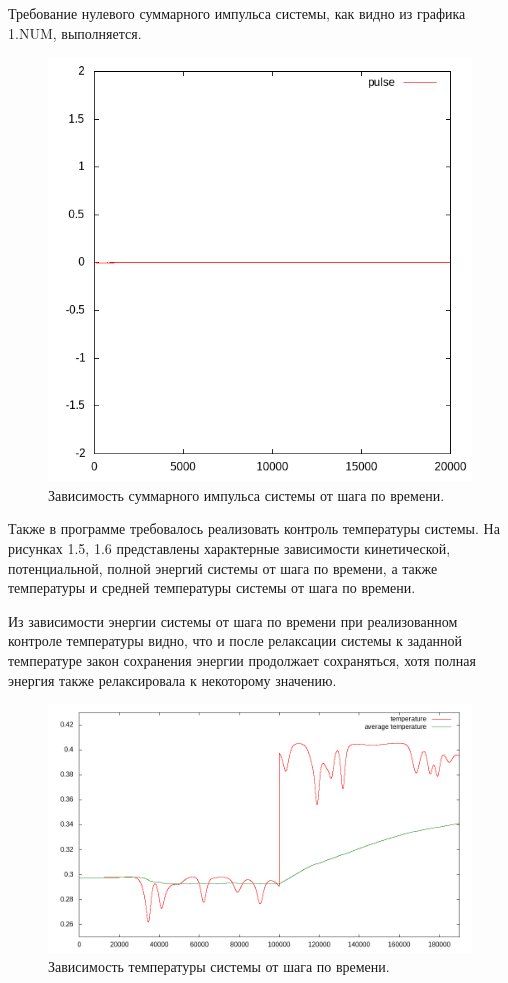 \documentclass[14pt,a4paper,report]{ncc}
\begin{document}
Требование нулевого суммарного импульса системы, как видно из графика 1.NUM, выполняется. 

\begin{figure}[!h]
\includegraphics[scale=0.8]{pulse}
\caption{Зависимость суммарного импульса системы от шага по времени.}
\end{figure}
Также в программе требовалось реализовать контроль температуры системы. 
На рисунках 1.5, 1.6 представлены характерные зависимости кинетической, потенциальной, полной энергий системы от шага по времени, а также температуры и средней температуры системы от шага по времени.
\

Из зависимости энергии системы от шага по времени при реализованном контроле температуры видно, что и после релаксации системы к заданной температуре закон сохранения энергии продолжает сохраняться, хотя полная энергия также релаксировала к некоторому значению.

\begin{figure}[!h]
\includegraphics[scale=0.6]{plot_temperature_control}
\caption{Зависимость температуры системы от шага по времени.}
\end{figure}
\newpage
\end{document}
